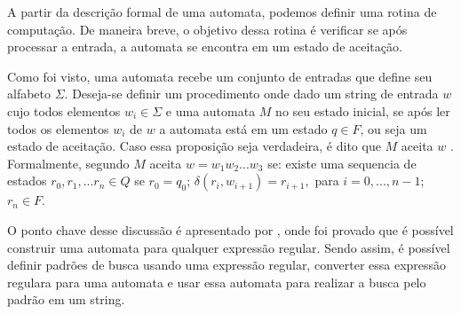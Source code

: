 A partir da descrição formal de uma automata, podemos definir uma rotina de computação.
De maneira breve, o objetivo dessa rotina é verificar se após processar a entrada, a automata se encontra em um estado de aceitação.

Como foi visto, uma automata recebe um conjunto de entradas que define seu alfabeto $\Sigma$.
Deseja-se definir um procedimento onde dado um string de entrada $w$ cujo todos elementos $w_i \in \Sigma$ e uma automata $M$ no seu estado inicial, se após ler todos os elementos $w_i$ de $w$ a automata está em um estado $q \in F$, ou seja um estado de aceitação.
Caso essa proposição seja verdadeira, é dito que $M$ aceita $w$ \cite{comp}.
Formalmente, segundo \cite{comp} $M$ aceita $w = w_1w_2...w_3$ se: existe uma sequencia de estados $r_0, r_1, ... r_n \in Q$ se $r_0 = q_0$; $\delta(r_i, w_{i+1}) = r_{i+1},$ para $i = 0, ..., n-1$; $r_n \in F$.

O ponto chave desse discussão é apresentado por \cite{comp}, onde foi provado que é possível construir uma automata para qualquer expressão regular.
Sendo assim, é possível definir padrões de busca usando uma expressão regular, converter essa expressão regulara para uma automata e usar essa automata para realizar a busca pelo padrão em um string.


